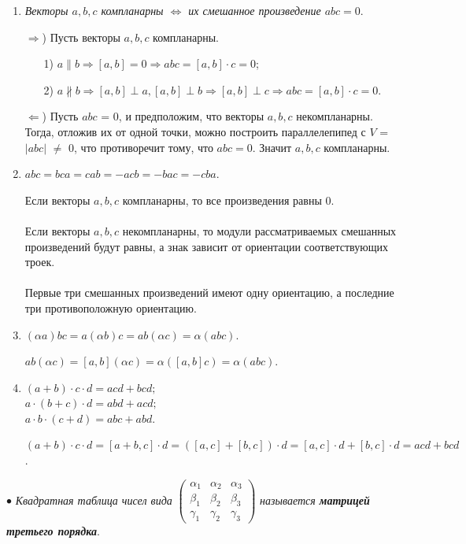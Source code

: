 \begin{enumerate}
	\item \textit{Векторы $a, b, c$ компланарны $\Longleftrightarrow$ их смешанное произведение $abc = 0$}.
	\begin{Proof}
		$\Rightarrow$) Пусть векторы $a, b, c$ компланарны.
		\begin{enumerate}
			\item [1)] $a \parallel b \Rightarrow [a, b] = 0 \Rightarrow abc = [a, b]\cdot c = 0$; 
			\item [2)] $a \nparallel b \Rightarrow [a, b] \perp a, [a, b] \perp b \Rightarrow [a, b] \perp c \Rightarrow abc = [a, b]\cdot c = 0$. 
		\end{enumerate}
		$\Leftarrow$) Пусть $abc$ = 0, и предположим, что векторы $a, b, c$ некомпланарны. Тогда, отложив их от одной точки, можно построить параллелепипед с $V$ = $|abc|$ $\not=$ 0, что противоречит тому, что $abc = 0$. Значит $a, b, c$ компланарны.
	\end{Proof}
	\item $abc = bca = cab = -acb = -bac = -cba$.
	\begin{Proof}
		Если векторы $a, b, c$ компланарны, то все произведения равны 0. \\\\
		Если векторы $a, b, c$ некомпланарны, то модули рассматриваемых смешанных произведений будут равны, а знак зависит от ориентации соответствующих троек. \\\\
		Первые три смешанных произведений имеют одну ориентацию, а последние три противоположную ориентацию.
	\end{Proof}
	\item $(\alpha a) bc = a (\alpha b) c = ab (\alpha c) = \alpha (abc)$.
	\begin{Proof}
		$ab(\alpha c) = [a, b] (\alpha c) = \alpha ([a, b] c) = \alpha (abc)$.
	\end{Proof}
	\item $(a + b) \cdot c \cdot d = acd + bcd;$ \\
	$a \cdot (b + c) \cdot d = abd + acd;$ \\
	$a \cdot b \cdot (c + d) = abc + abd.$
	\begin{Proof}
		$(a + b) \cdot c \cdot d = [a + b, c] \cdot d = ([a, c] + [b, c]) \cdot d = [a, c] \cdot d + [b, c] \cdot d = acd + bcd$.
	\end{Proof}
\end{enumerate}
$\bullet$ \textit{Квадратная таблица чисел вида} $\begin{pmatrix} \alpha_1 & \alpha_2 & \alpha_3 \\ 
	\beta_1 & \beta_2 & \beta_3 \\ \gamma_1 & \gamma_2 & \gamma_3 \end{pmatrix}$ \textit{называется \textbf{матрицей третьего порядка}}.\\
